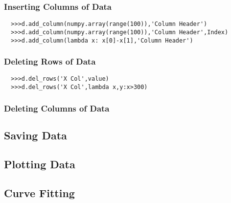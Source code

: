 \documentclass[a4paper,11pt]{scrartcl}
\begin{document}
\subsubsection{Inserting Columns of Data}

\begin{verbatim}
  >>>d.add_column(numpy.array(range(100)),'Column Header')
  >>>d.add_column(numpy.array(range(100)),'Column Header',Index)
  >>>d.add_column(lambda x: x[0]-x[1],'Column Header')    
\end{verbatim}

\subsubsection{Deleting Rows of Data}

\begin{verbatim}
  >>>d.del_rows('X Col',value)
  >>>d.del_rows('X Col',lambda x,y:x>300)
\end{verbatim}

\subsubsection{Deleting Columns of Data}

\subsection{Saving Data}

\subsection{Plotting Data}

\subsection{Curve Fitting}
\end{document}
